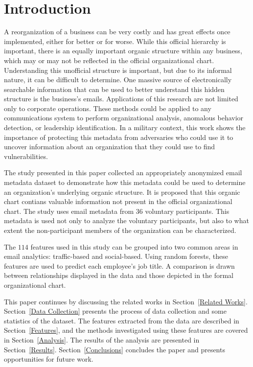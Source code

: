 \documentclass[10pt,twocolumn,conference]{IEEEtran}
\begin{document}
\section{Introduction}
A reorganization of a business can be very costly and has great effects once implemented, either for better or for worse.
While this official hierarchy is important, there is an equally important organic structure within any business, which may or may not be reflected in the official organizational chart.
Understanding this unofficial structure is important, but due to its informal nature, it can be difficult to determine.
One massive source of electronically searchable information that can be used to better understand this hidden structure is the business's emails.
Applications of this research are not limited only to corporate operations.
These methods could be applied to any communications system to perform organizational analysis, anomalous behavior detection, or leadership identification.
In a military context, this work shows the importance of protecting this metadata from adversaries who could use it to uncover information about an organization that they could use to find vulnerabilities.

The study presented in this paper collected an appropriately anonymized email metadata dataset to demonstrate how this metadata could be used to determine an organization's underlying organic structure.
It is proposed that this organic chart contians valuable information not present in the official organizational chart.
The study uses email metadata from $36$ voluntary participants.
This metadata is used not only to analyze the voluntary participants, but also to what extent the non-participant members of the organization can be characterized.

The $114$ features used in this study can be grouped into two common areas in email analytics: traffic-based and social-based.
Using random forests, these features are used to predict each employee's job title.
A comparison is drawn between relationships displayed in the data and those depicted in the formal organizational chart.  

This paper continues by discussing the related works in Section~\ref{Related Works}.
Section~\ref{Data Collection} presents the process of data collection and some statistics of the dataset.
The features extracted from the data are described in Section~\ref{Features}, and the methods investigated using these features are covered in Section~\ref{Analysis}.
The results of the analysis are presented in Section~\ref{Results}.
Section~\ref{Conclusions} concludes the paper and presents opportunities for future work.  
\end{document}
